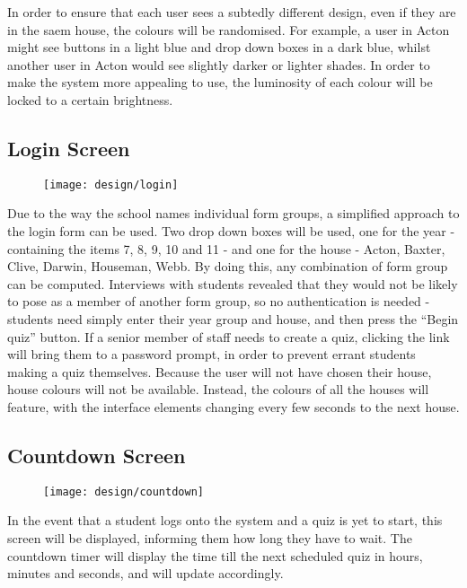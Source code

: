 In order to ensure that each user sees a subtedly different design, even if they are in the saem house, the colours will be randomised. For example, a user in Acton might see buttons in a light blue and drop down boxes in a dark blue, whilst another user in Acton would see slightly darker or lighter shades. In order to make the system more appealing to use, the luminosity of each colour will be locked to a certain brightness.

\subsection{Login Screen}
\begin{figure}[h!]
  \texttt{[image: design/login]}
\end{figure}

Due to the way the school names individual form groups, a simplified approach to the login form can be used. Two drop down boxes will be used, one for the year - containing the items 7, 8, 9, 10 and 11 - and one for the house - Acton, Baxter, Clive, Darwin, Houseman, Webb. By doing this, any combination of form group can be computed. Interviews with students revealed that they would not be likely to pose as a member of another form group, so no authentication is needed - students need simply enter their year group and house, and then press the ``Begin quiz'' button. If a senior member of staff needs to create a quiz, clicking the link will bring them to a password prompt, in order to prevent errant students making a quiz themselves. Because the user will not have chosen their house, house colours will not be available. Instead, the colours of all the houses will feature, with the interface elements changing every few seconds to the next house.

\clearpage

\subsection{Countdown Screen}
\begin{figure}[h!]
  \texttt{[image: design/countdown]}
\end{figure}

In the event that a student logs onto the system and a quiz is yet to start, this screen will be displayed, informing them how long they have to wait. The countdown timer will display the time till the next scheduled quiz in hours, minutes and seconds, and will update accordingly.

